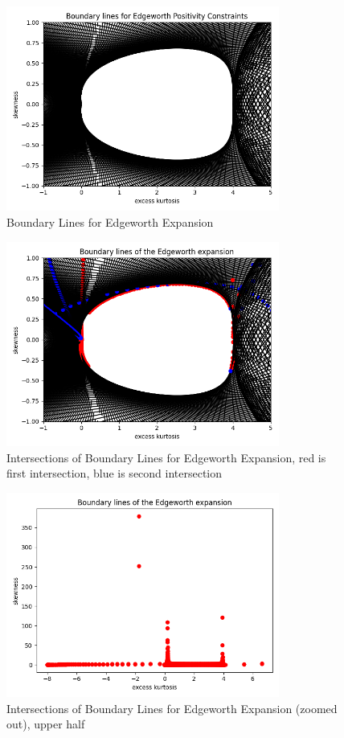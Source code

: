 \begin{figure}[h]
    \centering
    \includegraphics[width=0.8\textwidth]{img/edgeworth_positivity_boundary_lines.png}
    \caption{Boundary Lines for Edgeworth Expansion}
    \label{fig:ew_boundary_lines}
\end{figure}
\begin{figure}[h]
    \centering
    \includegraphics[width=0.8\textwidth]{img/edgeworth_positivity_boundary_intersections_1.png}
    \caption{Intersections of Boundary Lines for Edgeworth Expansion, red is first intersection, blue is second intersection}
    \label{fig:ew_boundary_intersections_1}
\end{figure}
\begin{figure}[h]
    \centering
    \includegraphics[width=0.8\textwidth]{img/edgeworth_positivity_boundary_intersections_3.png}
    \caption{Intersections of Boundary Lines for Edgeworth Expansion (zoomed out), upper half}
    \label{fig:ew_boundary_intersections_3}
\end{figure}

